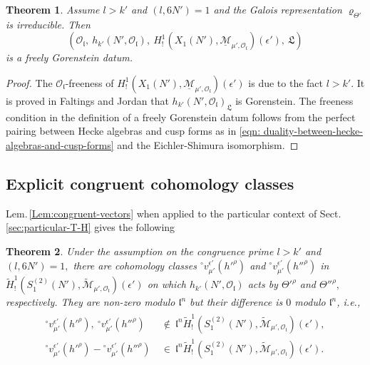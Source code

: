 \documentclass[11pt]{amsart}
\newtheorem{theorem}{Theorem}[section]
\begin{document}
\begin{theorem}
\label{thm:Hecke-Gorenstein}
	Assume $l > k'$ and $(l,6N') = 1$ and the Galois representation ${\varrho}_{\Theta'}$ is irreducible. Then 
	\begin{equation}
		(\mathcal{O}_\mathfrak{l}, \ h_{k'}(N', \mathcal{O}_\mathfrak{l}), \ 
		{H}^1_!(X_1(N'), \underline{\mathcal{M}}_{\mu',\mathcal{O}_\mathfrak{l}})(\epsilon'), \ \mathfrak{L})
	\end{equation}
	is a freely Gorenstein datum.
\end{theorem}

\begin{proof}
	The $\mathcal{O}_\mathfrak{l}$-freeness of $H^1_!(X_1(N'), \underline{\mathcal{M}}_{\mu',\mathcal{O}_\mathfrak{l}})(\epsilon')$ is due to the fact $l > k'$. 
	It is proved in Faltings and Jordan \cite[Thm.\,2.1]{faltings-jordan} that $h_{k'}(N',\mathcal{O}_\mathfrak{l})_\mathfrak{L}$ is Gorenstein. 
	The freeness condition in the definition of a freely Gorenstein datum follows from the perfect pairing between Hecke algebras and 
	cusp forms as in \eqref{eqn: duality-between-hecke-algebras-and-cusp-forms} and the Eichler-Shimura isomorphism. 
\end{proof}


\subsection{Explicit congruent cohomology classes}
\label{sec:explicit-coh-classes}

Lem.\,\ref{Lem:congruent-vectors} when applied to the particular context of Sect.\,\ref{sec:particular-T-H} gives the following

\begin{theorem} 
\label{thm:congruent-coh-classes}
Under the assumption on the congruence prime $l > k'$ and $(l,6N') = 1,$
	there are cohomology classes 
	${^\circ}v^{\epsilon'}_{\mu'}(h'^\rho)$ and ${^\circ}v^{\epsilon'}_{\mu'}(h''^\rho)$ in 
	$\tilde{H}^1_!(S_1^{(2)}({N}'), \widetilde{\mathcal{M}}_{\mu', \mathcal{O}_\mathfrak{l}})(\epsilon')$ 
	on which $h_{k'}({N'}, \mathcal{O}_\mathfrak{l})$ acts by $\Theta'^\rho$ and $\Theta''^\rho,$ respectively. 
	They are non-zero modulo $\mathfrak{l}^n$ but their difference is $0$ modulo $\mathfrak{l}^n$, i.e., 
	\begin{align} 
	\begin{aligned}
		{^\circ}v_{\mu'}^{\epsilon'}(h'^\rho), \ {^\circ}v_{\mu'}^{\epsilon'}(h''^\rho) &
		 \ \not\in \ \mathfrak{l}^n \tilde{H}^1_!(S_1^{(2)}({N}'), \widetilde{\mathcal{M}}_{\mu', \mathcal{O}_\mathfrak{l}})(\epsilon'), \\
		{^\circ}v^{\epsilon'}_{\mu'}(h'^\rho) - {^\circ}v^{\epsilon'}_{\mu'}(h''^\rho) &
		 \ \in \ \mathfrak{l}^n  \tilde{H}^1_!(S_1^{(2)}({N}'), \widetilde{\mathcal{M}}_{\mu', \mathcal{O}_\mathfrak{l}})(\epsilon').
	\end{aligned}
	\end{align}
\end{theorem}
\end{document}
